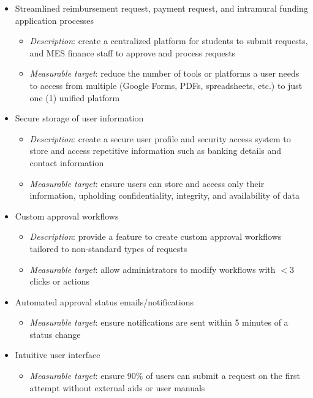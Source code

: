 \documentclass{article}
\begin{document}
\begin{itemize}
    \item Streamlined reimbursement request, payment request, and intramural funding application processes
    \begin{itemize}
        \item \emph{Description}: create a centralized platform for students to submit requests, and MES finance staff to approve and process requests
        \item \emph{Measurable target}: reduce the number of tools or platforms a user needs to access from multiple (Google Forms, PDFs, spreadsheets, etc.) to just one (1) unified platform
    \end{itemize}
    \item Secure storage of user information
    \begin{itemize}
        \item \emph{Description}: create a secure user profile and security access system to store and access repetitive information such as banking details and contact information
        \item \emph{Measurable target}: ensure users can store and access only their information, upholding confidentiality, integrity, and availability of data
    \end{itemize}
    \item Custom approval workflows
    \begin{itemize}
        \item \emph{Description}: provide a feature to create custom approval workflows tailored to non-standard types of requests
        \item \emph{Measurable target}: allow administrators to modify workflows with $<$3 clicks or actions
    \end{itemize}
    \item Automated approval status emails/notifications
    \begin{itemize}
        \item \emph{Measurable target}: ensure notifications are sent within 5 minutes of a status change
    \end{itemize}
    \item Intuitive user interface
    \begin{itemize}
        \item \emph{Measurable target}: ensure 90\% of users can submit a request on the first attempt without external aids or user manuals
    \end{itemize}
\end{itemize}
\end{document}
